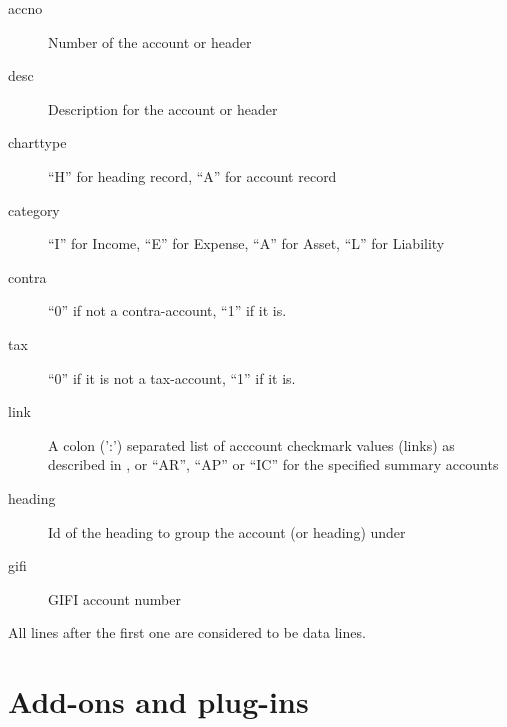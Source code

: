 \begin{description}
\item [accno] Number of the account or header
\item [desc] Description for the account or header
\item [charttype] ``H'' for heading record, ``A'' for account record
\item [category] ``I'' for Income, ``E'' for Expense, ``A'' for Asset, ``L'' for Liability
\item [contra] ``0'' if not a contra-account, ``1'' if it is.
\item [tax] ``0'' if it is not a tax-account, ``1'' if it is.
\item [link] A colon (':') separated list of acccount checkmark values (links) as described
    in , or ``AR'', ``AP'' or ``IC'' for the specified summary accounts
\item [heading] Id of the heading to group the account (or heading) under
\item [gifi] GIFI account number
\end{description}

All lines after the first one are considered to be data lines.

\chapter{Add-ons and plug-ins}
\label{cha-customization-add-ons}


